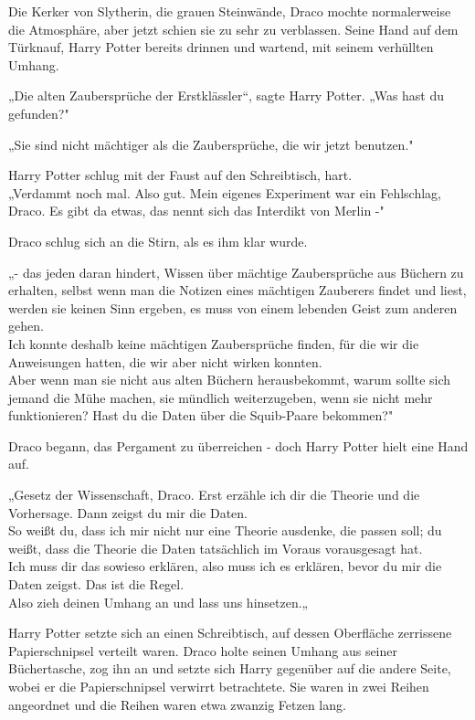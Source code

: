 {Die Kerker von Slytherin, die grauen Steinwände, Draco mochte normalerweise die Atmosphäre, aber jetzt schien sie zu sehr zu verblassen. Seine Hand auf dem Türknauf, Harry Potter bereits drinnen und wartend, mit seinem verhüllten Umhang.

„Die alten Zaubersprüche der Erstklässler“, sagte Harry Potter. „Was hast du gefunden?"

„Sie sind nicht mächtiger als die Zaubersprüche, die wir jetzt benutzen."

Harry Potter schlug mit der Faust auf den Schreibtisch, hart.\\ „Verdammt noch mal. Also gut. Mein eigenes Experiment war ein Fehlschlag, Draco. Es gibt da etwas, das nennt sich das Interdikt von Merlin -"

Draco schlug sich an die Stirn, als es ihm klar wurde.

„- das jeden daran hindert, Wissen über mächtige Zaubersprüche aus Büchern zu erhalten, selbst wenn man die Notizen eines mächtigen Zauberers findet und liest, werden sie keinen Sinn ergeben, es muss von einem lebenden Geist zum anderen gehen.\\ Ich konnte deshalb keine mächtigen Zaubersprüche finden, für die wir die Anweisungen hatten, die wir aber nicht wirken konnten.\\ Aber wenn man sie nicht aus alten Büchern herausbekommt, warum sollte sich jemand die Mühe machen, sie mündlich weiterzugeben, wenn sie nicht mehr funktionieren? Hast du die Daten über die Squib-Paare bekommen?"

Draco begann, das Pergament zu überreichen - doch Harry Potter hielt eine Hand auf.

„Gesetz der Wissenschaft, Draco. Erst erzähle ich dir die Theorie und die Vorhersage. Dann zeigst du mir die Daten.\\ So weißt du, dass ich mir nicht nur eine Theorie ausdenke, die passen soll; du weißt, dass die Theorie die Daten tatsächlich im Voraus vorausgesagt hat.\\ Ich muss dir das sowieso erklären, also muss ich es erklären, bevor du mir die Daten zeigst. Das ist die Regel.\\ Also zieh deinen Umhang an und lass uns hinsetzen.„

Harry Potter setzte sich an einen Schreibtisch, auf dessen Oberfläche zerrissene Papierschnipsel verteilt waren. Draco holte seinen Umhang aus seiner Büchertasche, zog ihn an und setzte sich Harry gegenüber auf die andere Seite, wobei er die Papierschnipsel verwirrt betrachtete. Sie waren in zwei Reihen angeordnet und die Reihen waren etwa zwanzig Fetzen lang.

}
